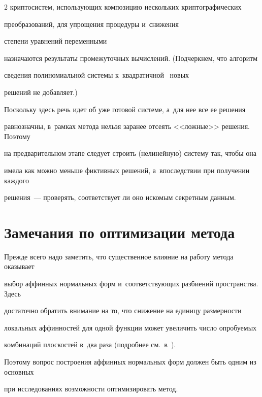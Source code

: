 \begin{multicols}{2}
криптосистем, использующих композицию нескольких криптографических 


преобразований, для упрощения процедуры и~снижения\linebreak


 степени уравнений переменными 


назначаются результаты промежуточных вычислений. (Подчеркнем, что алгоритм 


сведения полиномиальной сис\-те\-мы к~квадратичной~\cite[\S{}.2]{Bard2009} новых 


решений не добавляет.)








    Поскольку здесь речь идет об уже готовой системе, а~для нее все ее решения 


равнозначны, в~рамках метода нельзя заранее отсеять <<ложные>> решения. Поэтому 


на предварительном этапе следует строить (нелинейную) систему так, чтобы она 


имела как можно меньше фиктивных решений, а~впоследствии при получении каждого 


решения~--- проверять, соответствует ли оно искомым секретным данным.








\section{Замечания по оптимизации метода}\label{optim}





Прежде всего надо заметить, что существенное влияние на работу метода оказывает 


выбор аффинных нормальных форм и~соответствующих раз\-би\-ений пространства. Здесь 


достаточно обратить внимание на то, что снижение на единицу размерности 


локальных аффинностей для одной функции может увеличить число опробуемых 


комбинаций плоскостей в~два раза (подробнее см.\ в~\cite{LSF2019}).


Поэтому вопрос построения аффинных нормальных форм должен быть одним из основных 


при исследованиях возможности оптимизировать метод.






\end{multicols}
